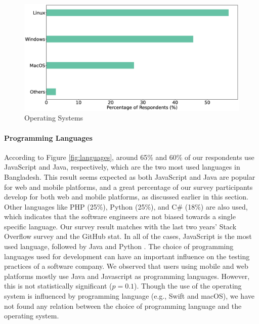 \begin{figure}[h]
\centering
  \includegraphics[scale=0.17]{Figures/Respondents_os}
  \caption{Operating Systems}
  \label{fig:os}
\end{figure}


\paragraph{Programming Languages}
According to Figure \ref{fig:languages}, around 65\% and 60\% of our respondents use JavaScript and Java, respectively, which are the two most used languages in Bangladesh. This result seems expected as both JavaScript and Java are popular for web and mobile platforms, and a great percentage of our survey participants develop for both web and mobile platforms, as discussed earlier in this section. Other languages like PHP (25\%), Python (25\%), and C\# (18\%) are also used, which indicates that the software engineers are not biased towards a single specific language. Our survey result matches with the last two years' Stack Overflow survey and the GitHub stat. In all of the cases, JavaScript is the most used language, followed by Java and Python \cite{StackoverflowSurvey2020, StackoverflowSurvey2019, GithubStat}. The choice of programming languages used for development can have an important influence on the testing practices of a software company. We observed that users using mobile and web platforms mostly use Java and Javascript as programming languages. However, this is not statistically significant ($p=0.1$). Though the use of the operating system is influenced by programming language (e.g., Swift and macOS), we have not found any relation between the choice of programming language and the operating system.

